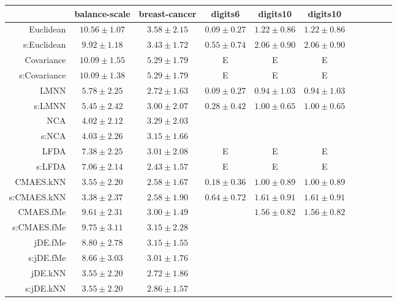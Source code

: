 \begin{table}[ht] \centering
{\small\renewcommand{\arraystretch}{1.0}
\setlength{\tabcolsep}{2pt}
\begin{tabular}{rcccccccccc}
\toprule


& \multicolumn{1}{c}{balance-scale} & \multicolumn{1}{c}{breast-cancer} & \multicolumn{1}{c}{digits6} & \multicolumn{1}{c}{digits10} & \multicolumn{1}{c}{digits10} \\ 
\midrule
Euclidean & $10.56\pm1.07$ & $3.58\pm2.15$ & $\bm{0.09\pm0.27}$ & $1.22\pm0.86$ & $1.22\pm0.86$ \\
s:Euclidean & $9.92\pm1.18$ & $3.43\pm1.72$ & $0.55\pm0.74$ & $2.06\pm0.90$ & $2.06\pm0.90$ \\
Covariance & $10.09\pm1.55$ & $5.29\pm1.79$ & E  & E  & E  \\
s:Covariance & $10.09\pm1.38$ & $5.29\pm1.79$ & E  & E  & E  \\
LMNN & $5.78\pm2.25$ & $2.72\pm1.63$ & $\bm{0.09\pm0.27}$ & $\bm{0.94\pm1.03}$ & $\bm{0.94\pm1.03}$ \\
s:LMNN & $5.45\pm2.42$ & $3.00\pm2.07$ & $0.28\pm0.42$ & $1.00\pm0.65$ & $1.00\pm0.65$ \\
NCA & $4.02\pm2.12$ & $3.29\pm2.03$ &  &  &  \\
s:NCA & $4.03\pm2.26$ & $3.15\pm1.66$ &  &  &  \\
LFDA & $7.38\pm2.25$ & $3.01\pm2.08$ & E  & E  & E  \\
s:LFDA & $7.06\pm2.14$ & $\bm{2.43\pm1.57}$ & E  & E  & E  \\
CMAES.kNN & $3.55\pm2.20$ & $2.58\pm1.67$ & $0.18\pm0.36$ & $1.00\pm0.89$ & $1.00\pm0.89$ \\
s:CMAES.kNN & $\bm{3.38\pm2.37}$ & $2.58\pm1.90$ & $0.64\pm0.72$ & $1.61\pm0.91$ & $1.61\pm0.91$ \\
CMAES.fMe & $9.61\pm2.31$ & $3.00\pm1.49$ &  & $1.56\pm0.82$ & $1.56\pm0.82$ \\
s:CMAES.fMe & $9.75\pm3.11$ & $3.15\pm2.28$ &  &  &  \\
jDE.fMe & $8.80\pm2.78$ & $3.15\pm1.55$ &  &  &  \\
s:jDE.fMe & $8.66\pm3.03$ & $3.01\pm1.76$ &  &  &  \\
jDE.kNN & $3.55\pm2.20$ & $2.72\pm1.86$ &  &  &  \\
s:jDE.kNN & $3.55\pm2.20$ & $2.86\pm1.57$ &  &  &  \\

\end{tabular}}
\end{table}
